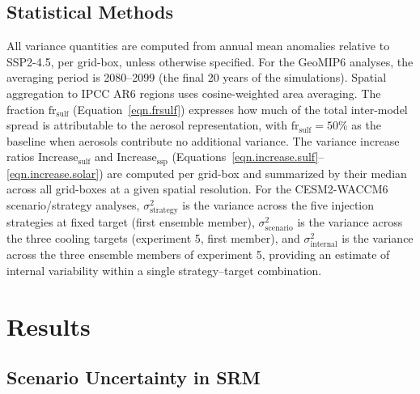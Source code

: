 \documentclass[draft]{agujournal2019}
\begin{document}
\subsection*{Statistical Methods}

All variance quantities are computed from annual mean anomalies relative to SSP2-4.5, per grid-box, unless otherwise specified. For the GeoMIP6 analyses, the averaging period is 2080--2099 (the final 20 years of the simulations). Spatial aggregation to IPCC AR6 regions uses cosine-weighted area averaging. The fraction $\mbox{fr}_{\mathrm{sulf}}$ (Equation~\ref{eqn.frsulf}) expresses how much of the total inter-model spread is attributable to the aerosol representation, with $\mbox{fr}_{\mathrm{sulf}} = 50\%$ as the baseline when aerosols contribute no additional variance. The variance increase ratios $\mbox{Increase}_{\mathrm{sulf}}$ and $\mbox{Increase}_{\mathrm{ssp}}$ (Equations~\ref{eqn.increase.sulf}--\ref{eqn.increase.solar}) are computed per grid-box and summarized by their median across all grid-boxes at a given spatial resolution. For the CESM2-WACCM6 scenario/strategy analyses, $\sigma^2_{\mathrm{strategy}}$ is the variance across the five injection strategies at fixed target (first ensemble member), $\sigma^2_{\mathrm{scenario}}$ is the variance across the three cooling targets (experiment 5, first member), and $\sigma^2_{\mathrm{internal}}$ is the variance across the three ensemble members of experiment 5, providing an estimate of internal variability within a single strategy--target combination.


\section{Results}

\subsection{Scenario Uncertainty in SRM}
\end{document}
